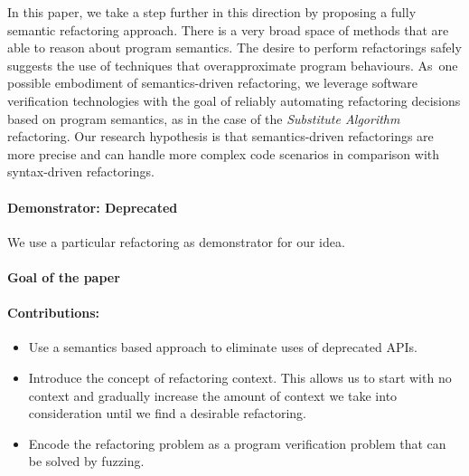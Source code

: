 \documentclass[runningheads,a4paper]{llncs}
\begin{document}
In this paper, we take a step further in this direction by proposing a
fully semantic refactoring approach.  There is a very broad space of
methods that are able to reason about program semantics.  The desire
to perform refactorings safely suggests the use of techniques that
overapproximate program behaviours.  As~one possible embodiment of
semantics-driven refactoring, we leverage software verification
technologies with the goal of reliably automating refactoring
decisions based on program semantics, as in the case of the {\em
  Substitute Algorithm} refactoring. Our research hypothesis is that
semantics-driven refactorings are more precise and can handle more
complex code scenarios in comparison with syntax-driven refactorings.



\paragraph{Demonstrator: Deprecated}

We use a particular refactoring as demonstrator for our idea.

\paragraph{Goal of the paper} 

\paragraph{Contributions:}

\begin{itemize}

\item Use a semantics based approach to eliminate uses of deprecated APIs.

\item Introduce the concept of refactoring context. This allows us to start
  with no context and gradually increase the amount of context we take into consideration
  until we find a desirable refactoring.
  
\item Encode the refactoring problem as a program verification problem that can be solved
  by fuzzing.
  
\end{itemize}  
\end{document}
